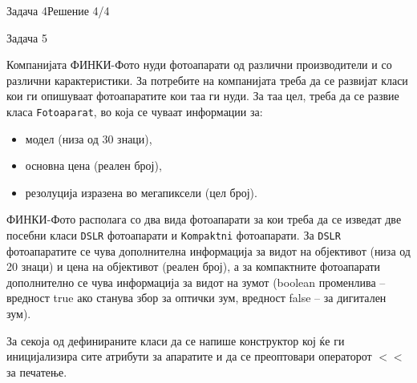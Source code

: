 \begin{frame}[fragile]{Задача 4}{Решение 4/4}

\end{frame}

\begin{frame}{Задача 5}
\begin{scriptsize}
Компанијата ФИНКИ-Фото нуди фотоапарати од различни производители и со различни
карактеристики. За потребите на компанијата треба да се развијат класи кои ги
опишуваат фотоапаратите кои таа ги нуди. За таа цел, треба да се развие класа
\texttt{Fotoaparat}, во која се чуваат информации за:
\begin{itemize}
  \item модел (низа од 30 знаци),
  \item основна цена (реален број),
  \item резолуција изразена во мегапиксели (цел број).
\end{itemize}

ФИНКИ-Фото располага со два вида фотоапарати за кои треба да се изведат две
посебни класи \texttt{DSLR} фотоапарати и \texttt{Kompaktni} фотоапарати. За
\texttt{DSLR} фотоапаратите се чува дополнителна информација за видот на
објективот (низа од 20 знаци) и цена на објективот (реален број), а за
компактните фотоапарати дополнително се чува информација за видот на зумот
(boolean променлива – вредност true ако станува збор за оптички зум, вредност
false – за дигитален зум). 

За секоја од дефинираните класи да се напише конструктор кој ќе ги иницијализира
сите атрибути за апаратите и да се преоптовари операторот $<<$ за печатење.

\end{scriptsize}
\end{frame}

